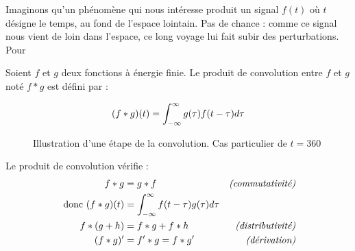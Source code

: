 Imaginons qu'un phénomène qui nous intéresse produit un signal $f(t)$ où $t$ désigne le temps, au fond de l'espace lointain. Pas de chance : comme ce signal nous vient de loin dans l'espace, ce long voyage lui fait subir des perturbations. Pour 

\begin{boxedminipage}{15cm}
\begin{definition}
Soient $f$ et $g$ deux fonctions à énergie finie.
Le produit de convolution entre $f$ et $g$ noté $f*g$ est défini par :

\begin{equation}
(f*g)(t)=\int_{-\infty}^{\infty} g(\tau)f(t-\tau)d\tau
\end{equation}
\end{definition}
\end{boxedminipage}

\newcommand{\convscale}{0.52}

\begin{figure}
\begin{center}
\end{center}
\caption{Illustration d'une étape de la convolution. Cas particulier de $t=360$}
\end{figure}

Le produit de convolution vérifie :
\begin{eqnarray}
  f*g & =g*f & \textit{(commutativité)} \label{convolution-commut}\\
\text{~donc~} (f*g)(t) &=\int_{-\infty}^{\infty} f(t-\tau)g(\tau)d\tau & \\
f*(g+h) & =f*g+f*h & \textit{(distributivité)} \label{convolution-distrib}\\
(f*g)' & =f'*g=f*g' & \textit{(dérivation)} \label{convolution-derivation}
\end{eqnarray}

